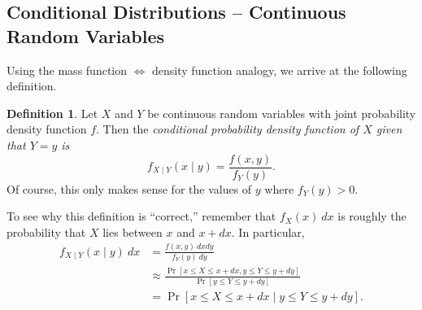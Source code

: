 \documentclass[12pt]{article}
\theoremstyle{plain}
\theoremstyle{definition}
\newtheorem{definition}[theorem]{Definition}
\theoremstyle{remark}
\begin{document}










\subsection{Conditional Distributions -- Continuous Random Variables}
Using the mass function $\iff$ density function analogy, we arrive at the following definition.

\begin{definition}
    Let $X$ and $Y$ be continuous random variables with joint probability density function $f$.
    Then the \emph{conditional probability density function of $X$ given that $Y=y$ is}
    \[
        f_{X\mid Y}(x\mid y) = \frac{f(x,y)}{f_Y(y)}.
    \]
    Of course, this only makes sense for the values of $y$ where $f_Y(y)>0$.
\end{definition}

To see why this definition is ``correct,'' remember that $f_X(x)\ dx$ is roughly the probability that $X$ lies between $x$ and $x+dx$.
In particular,
\begin{align*}
    f_{X\mid Y}(x\mid y)\ dx &= \frac{f(x,y)\ dxdy}{f_Y(y)\ dy}\\
    &\approx \frac{\Pr[x \leq X\leq x+dx, y\leq Y \leq y+dy]}{\Pr[y\leq Y\leq y+dy]}\\
    &= \Pr[x\leq X \leq x+dx \mid y\leq Y \leq y+dy].
\end{align*}
\end{document}
